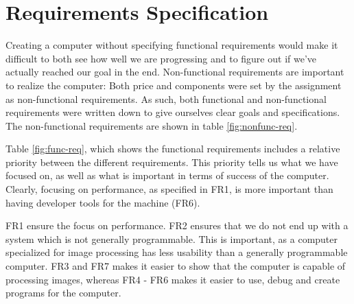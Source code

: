 \section{Requirements Specification}



Creating a computer without specifying functional requirements would make it
difficult to both see how well we are progressing and to figure out if we've
actually reached our goal in the end. Non-functional requirements are important
to realize the computer: Both price and components were set by the assignment as
non-functional requirements. As such, both functional and non-functional
requirements were written down to give ourselves clear goals and
specifications. The non-functional requirements are shown in table
\ref{fig:nonfunc-req}. 



Table \ref{fig:func-req}, which shows the functional requirements includes a
relative priority between the different requirements. This priority tells us
what we have focused on, as well as what is important in terms of success of the
computer. Clearly, focusing on performance, as specified in {\sc FR1}, is more
important than having developer tools for the machine ({\sc FR6}).

{\sc FR1} ensure the focus on performance. {\sc FR2} ensures that we do not end
up with a system which is not generally programmable. This is important, as a
computer specialized for image processing has less usability than a generally
programmable computer. {\sc FR3} and {\sc FR7} makes it easier to show that the
computer is capable of processing images, whereas {\sc FR4 - FR6} makes it
easier to use, debug and create programs for the computer.
